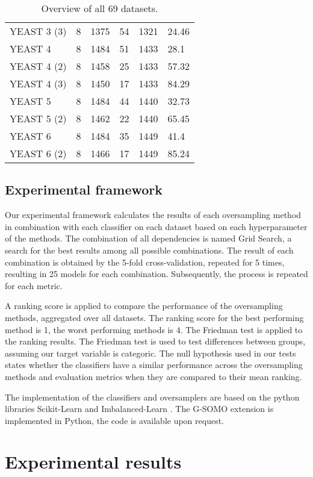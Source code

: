 \documentclass[parskip=full]{scrartcl}
\begin{document}
\begin{table} [H]
\begin{tabular}{ |p{4cm}||p{2.2cm}|p{2.2cm}|p{2.2cm}|p{2.2cm}|p{2.2cm}|  }
YEAST 3 (3)&	8&	1375&	54&	1321&	24.46\\
YEAST 4&	8&	1484&	51&	1433&	28.1\\
YEAST 4 (2)&	8&	1458&	25&	1433&	57.32\\
YEAST 4 (3)&	8&	1450&	17&	1433&	84.29\\
YEAST 5&	8&	1484&	44&	1440&	32.73\\
YEAST 5 (2)&	8&	1462&	22&	1440&	65.45\\
YEAST 6&	8&	1484&	35&	1449&	41.4\\
YEAST 6 (2)&	8&	1466&	17&	1449&	85.24\\

 \hline
\end{tabular}

\caption{Overview of all 69 datasets.}
   \label{tab:test}
\end{table} 


\subsection{Experimental framework}

Our experimental framework calculates the results of each oversampling method in combination 
with each classifier on each dataset based on each hyperparameter of the methods. The combination 
of all dependencies is named Grid Search, a search for the best results among all possible 
combinations. The result of each combination is obtained by the 5-fold cross-validation, 
repeated for 5 times, resulting in 25 models for each combination. Subsequently, the process 
is repeated for each metric. 

A ranking score is applied to compare the performance of the oversampling methods, aggregated 
over all datasets. The ranking score for the best performing method is 1, the worst performing 
methods is 4. The Friedman test is applied to the ranking results. The Friedman test is used 
to test differences between groups, assuming our target variable is categoric. The null hypothesis 
used in our tests states whether the classifiers have a similar performance across the 
oversampling methods and evaluation metrics when they are compared to their mean ranking.

The implementation of the classifiers and oversamplers are based on the python libraries Scikit-Learn 
\cite{Pedregosa2012} and Imbalanced-Learn \cite{Lemaitre2016}. The G-SOMO extension is implemented in 
Python, the code is available upon request.

\section{Experimental results}
\end{document}
